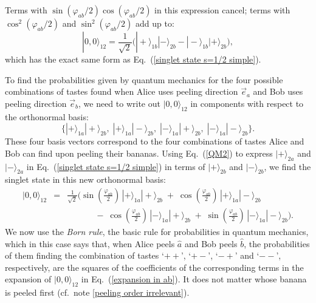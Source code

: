 Terms with $\sin{\!\left( \varphi_{ab}/{2} \right)} \cos{\!\left( \varphi_{ab}/{2} \right)}$ in this expression cancel; terms with $\cos^2{\!\left( \varphi_{ab}/{2} \right)}$ and $\sin^2{\!\left( \varphi_{ab}/{2} \right)}$ add up to:
\begin{equation}
|0, 0 \rangle_{12} = \frac{1}{\sqrt{2}} \Big( |+ \rangle_{1b} |- \rangle_{2b}  - |-  \rangle_{1b} | + \rangle_{2b} \Big), 
\label{QM3}
\end{equation}
 which has the exact same form as Eq.\ (\ref{singlet state s=1/2 simple}).   

To find the probabilities given by quantum mechanics for the four possible combinations of tastes found when Alice uses peeling direction $\vec{e}_a$  and Bob uses peeling direction $\vec{e}_b$, we need to write out $| 0, 0 \rangle_{12}$ in components with respect to the orthonormal basis:
\begin{equation}
\Big\{ |+ \rangle_{1a} |+ \rangle_{2b}, \; |+ \rangle_{1a} |- \rangle_{2b}, \; | - \rangle_{1a} | + \rangle_{2b}, \; |- \rangle_{1a} |- \rangle_{2b} \Big\}.
\label{QM4}
\end{equation}
These four basis vectors correspond to the four combinations of tastes Alice and Bob can find upon peeling their bananas. Using Eq.\ (\ref{QM2}) to express $|+ \rangle_{2a}$ and $|- \rangle_{2a}$ in Eq.\ (\ref{singlet state s=1/2 simple}) in terms of $|+ \rangle_{2b}$ and $|- \rangle_{2b}$, we find the singlet state in this new orthonormal basis:
\begin{eqnarray}
|0, 0 \rangle_{12}  & \! \! = \! \! & \frac{1}{\sqrt{2}} \Big( \sin{\! \left( \frac{\varphi_{ab}}{2} \right)} \, |+ \rangle_{1a}  |+ \rangle_{2b}  
\; + \;   \cos{\! \left( \frac{\varphi_{ab}}{2} \right)} \, |+ \rangle_{1a} |- \rangle_{2b} \nonumber \\
 &  & \quad \quad \quad \; - \;   \cos{\! \left( \frac{\varphi_{ab}}{2} \right)} \, | -  \rangle_{1a} | + \rangle_{2b}  
\; + \;   \sin{\! \left( \frac{\varphi_{ab}}{2} \right)} \, |-  \rangle_{1a} |- \rangle_{2b} \Big).
\label{expansion in ab}
\end{eqnarray}
We now use the \emph{Born rule}, the basic rule for probabilities in quantum mechanics, which in this case says that, when Alice peels $\hat{a}$ and Bob peels $\hat{b}$, the probabilities of them finding the combination of tastes `$++$', `$+-$', `$-+$' and `$--$', respectively, are the squares of the coefficients of the corresponding terms in the expansion of $| 0, 0 \rangle_{12}$ in Eq.\ (\ref{expansion in ab}).  It does not matter whose banana is peeled first (cf.\ note \ref{peeling order irrelevant}).

